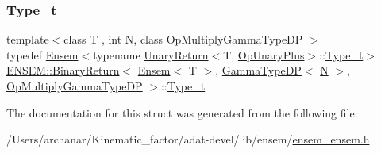 \subsubsection{\texorpdfstring{Type\_t}{Type\_t}\hspace{0.1cm}{\footnotesize\ttfamily [3/3]}}
{\footnotesize\ttfamily template$<$class T , int N, class Op\+Multiply\+Gamma\+Type\+DP $>$ \\
typedef \mbox{\hyperlink{classENSEM_1_1Ensem}{Ensem}}$<$typename \mbox{\hyperlink{structENSEM_1_1UnaryReturn}{Unary\+Return}}$<$T, \mbox{\hyperlink{structENSEM_1_1OpUnaryPlus}{Op\+Unary\+Plus}}$>$\+::\mbox{\hyperlink{structENSEM_1_1BinaryReturn_3_01Ensem_3_01T_01_4_00_01GammaTypeDP_3_01N_01_4_00_01OpMultiplyGammaTypeDP_01_4_a650eb1d413c72965f9b440752c5ba381}{Type\+\_\+t}}$>$ \mbox{\hyperlink{structENSEM_1_1BinaryReturn}{E\+N\+S\+E\+M\+::\+Binary\+Return}}$<$ \mbox{\hyperlink{classENSEM_1_1Ensem}{Ensem}}$<$ T $>$, \mbox{\hyperlink{classENSEM_1_1GammaTypeDP}{Gamma\+Type\+DP}}$<$ \mbox{\hyperlink{adat__devel_2lib_2hadron_2operator__name__util_8cc_a7722c8ecbb62d99aee7ce68b1752f337}{N}} $>$, \mbox{\hyperlink{structENSEM_1_1OpMultiplyGammaTypeDP}{Op\+Multiply\+Gamma\+Type\+DP}} $>$\+::\mbox{\hyperlink{structENSEM_1_1BinaryReturn_3_01Ensem_3_01T_01_4_00_01GammaTypeDP_3_01N_01_4_00_01OpMultiplyGammaTypeDP_01_4_a650eb1d413c72965f9b440752c5ba381}{Type\+\_\+t}}}



The documentation for this struct was generated from the following file\+:\begin{DoxyCompactItemize}
\item 
/\+Users/archanar/\+Kinematic\+\_\+factor/adat-\/devel/lib/ensem/\mbox{\hyperlink{adat-devel_2lib_2ensem_2ensem__ensem_8h}{ensem\+\_\+ensem.\+h}}\end{DoxyCompactItemize}
